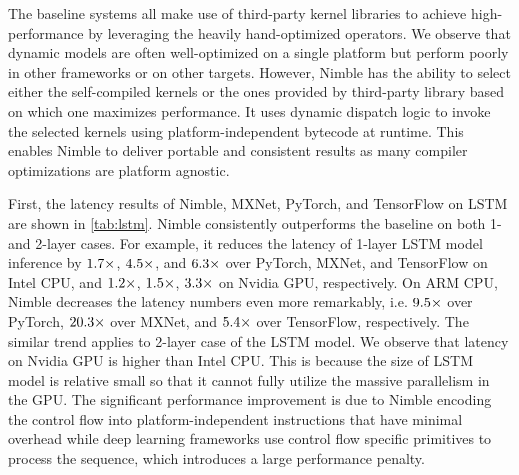 The baseline systems all make use of third-party kernel libraries to achieve high-performance by leveraging the heavily hand-optimized operators. We observe that dynamic models are often well-optimized on a single platform but perform poorly in other frameworks or on other targets. However, Nimble has the ability to select either the self-compiled kernels or the ones provided by third-party library based on which one maximizes performance. It uses dynamic dispatch logic to invoke the selected kernels using platform-independent bytecode at runtime. This enables Nimble to deliver portable and consistent results as many compiler optimizations are platform agnostic.

First, the latency results of Nimble, MXNet, PyTorch, and TensorFlow on LSTM are shown in \autoref{tab:lstm}. Nimble consistently outperforms the baseline on both 1- and 2-layer cases. For example, it reduces the latency of 1-layer LSTM model inference by $\fpeval{round(79.3 / 47.8, 1)}\times$, $\fpeval{round(212.9 / 47.8, 1)}\times$, and $\fpeval{round(301.4 / 47.8, 1)}\times$ over PyTorch, MXNet, and TensorFlow on Intel CPU,
and $\fpeval{round(110.3/93.0, 1)}\times$, $\fpeval{round(135.7/93.0, 1)}\times$, $\fpeval{round(304.7/93.0, 1)}\times$ on Nvidia GPU, respectively.
On ARM CPU, Nimble decreases the latency numbers even more remarkably, i.e. $\fpeval{round(1729.5 / 182.2, 1)}\times$ over PyTorch, $\fpeval{round(3695.9 / 182.2, 1)}\times$ over MXNet, and $\fpeval{round(978.3 / 182.2, 1)}\times$ over TensorFlow, respectively.
The similar trend applies to 2-layer case of the LSTM model.
We observe that latency on Nvidia GPU is higher than Intel CPU. This is because the size of LSTM model is relative small so that it cannot fully utilize the massive parallelism in the GPU.
The significant performance improvement is due to Nimble encoding the control flow into platform-independent instructions that have minimal overhead while deep learning frameworks use control flow specific primitives to process the sequence, which introduces a large performance penalty.

